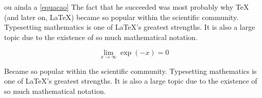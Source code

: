 ou ainda a \autoref{equacao} The fact that he succeeded was most probably why TeX (and later on, LaTeX) became so popular within the scientific community. Typesetting mathematics is one of LaTeX's greatest strengths. It is also a large topic due to the existence of so much mathematical notation.

\begin{equation}
	\label{equacao}
	\lim_{x \to \infty} \exp(-x) = 0
\end{equation}

Became so popular within the scientific community. Typesetting mathematics is one of LaTeX's greatest strengths. It is also a large topic due to the existence of so much mathematical notation.